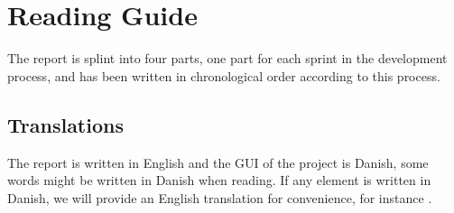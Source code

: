 
\section*{Reading Guide}
The report is splint into four parts, one part for each sprint in the development process\parencite{scrum}, and has been written in chronological order according to this process. 

\subsection*{Translations}
\label{sub:translations}
The report is written in English and the GUI of the project is Danish, some words might be written in Danish when reading. If any element is written in Danish, we will provide an English translation for convenience, for instance .




